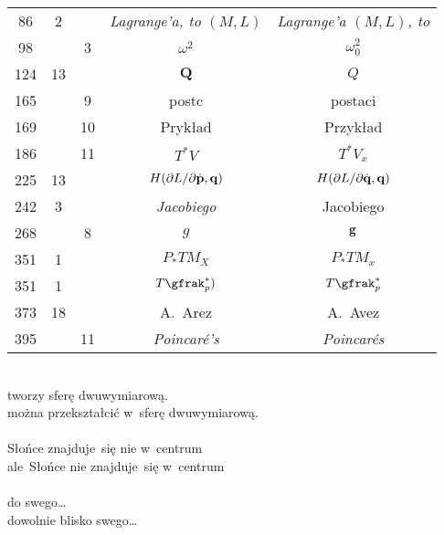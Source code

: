 \documentclass[a4paper,11pt]{article}
\begin{document}
\begin{center}
\begin{tabular}{|c|c|c|c|c|}
    86  &  2 & & \textit{Lagrange’a, to $( M, L )$}
           & \textit{Lagrange’a $( M, L )$, to} \\
    98  & &  3 & $\omega^{ 2 }$ & $\omega_{ 0 }^{ 2 }$ \\
    124 & 13 & & $\mathbf{Q}$ & $Q$ \\
    165 & &  9 & postc & postaci \\
    169 & & 10 & Prykład & Przykład \\
    186 & & 11 & $T^{ * } V$ & $T^{ * } V_{ x }$ \\
    225 & 13 & & $H( \partial L / \partial \dot{ \mathbf{p} }, \mathbf{q} )$
           & $H( \partial L / \partial \dot{ \mathbf{q} }, \mathbf{q} )$ \\
    242 &  3 & & \textit{Jacobiego} & Jacobiego \\
    268 & &  8 & $g$ & $\mathbf{g}$ \\
    351 &  1 & & $P_{ * }TM_{ X }$ & $P_{ * }TM_{ x }$ \\
    351 &  1 & & $T\gfrak_{ p }^{ * })$ & $T\gfrak_{ p }^{ * }$ \\
    373 & 18 & & A.~Arez & A.~Avez \\
    395 & & 11 & \textit{Poincar\'{e}'s} & \textit{Poincar\'{e}s} \\
    \hline
  \end{tabular}

\end{center}


\noindent
{} \\
\Jest  tworzy sferę dwuwymiarową. \\
\Powin można przekształcić w~sferę dwuwymiarową. \\
 \\
\Jest  Słońce znajduje~się nie w~centrum \\
\Powin ale~Słońce nie znajduje~się w~centrum \\
 \\
\Jest  do swego\ldots \\
\Powin dowolnie blisko swego\ldots \\


\vspace{\spaceTwo}
\end{document}
